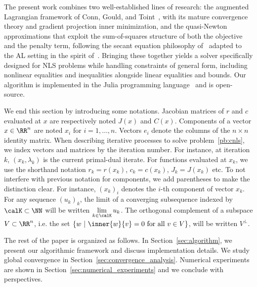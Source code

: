 The present work combines two well-established lines of research: the augmented Lagrangian framework of Conn, Gould, and Toint~\cite{conn-etal:1988a, conn-etal:1991, conn-etal:1993, conn-etal:1996b, conn-etal:2000}, with its mature convergence theory and gradient projection inner minimization, and the quasi-Newton approximations that exploit the sum-of-squares structure of both the objective and the penalty term, following the secant equation philosophy of~\cite{biggs:1977,dennisetal:1981} adapted to the AL setting in the spirit of~\cite{li-etal:2002}. Bringing these together yields a solver specifically designed for NLS problems while handling constraints of general form, including nonlinear equalities and inequalities alongside linear equalities and bounds. Our algorithm is implemented in the Julia programming language~\cite{bezanson-etal:2017} and is open-source.

We end this section by introducing some notations. Jacobian matrices of $r$ and $c$ evaluated at $x$ are respectively noted $J(x)$ and $C(x)$. Components of a vector $x\in\RR^n$ are noted $x_i$ for $i=1,\ldots,n$. Vectors $e_i$ denote the columns of the $n \times n$ identity matrix. When describing iterative processes to solve problem~\eqref{pb:cnls}, we index vectors and matrices by the iteration number. For instance, at iteration $k$, $(x_k,\lambda_k)$ is the current primal-dual iterate. For functions evaluated at $x_k$, we use the shorthand notation $r_k = r(x_k)$, $c_k =c(x_k)$, $J_k=J(x_k)$ etc. To not interfere with previous notation for components, we add parentheses to make the distinction clear. For instance, $(x_k)_i$ denotes the $i$-th component of vector $x_k$. For any sequence $(u_k)_k$, the limit of a converging subsequence indexed by $\calK \subset \NN$ will be written $\lim\limits_{k \in \calK} u_k$. The orthogonal complement of a subspace $V \subset \RR^n$, i.e. the set $\{ w\ | \ \inner{w}{v}=0\ \text{for all}\ v \in V\}$, will be written $V^\perp$.

The rest of the paper is organized as follows. In Section~\ref{sec:algorithm}, we present our algorithmic framework and discuss implementation details. We study global convergence in Section~\ref{sec:convergence_analysis}. Numerical experiments are shown in Section~\ref{sec:numerical_experiments} and we conclude with perspectives.